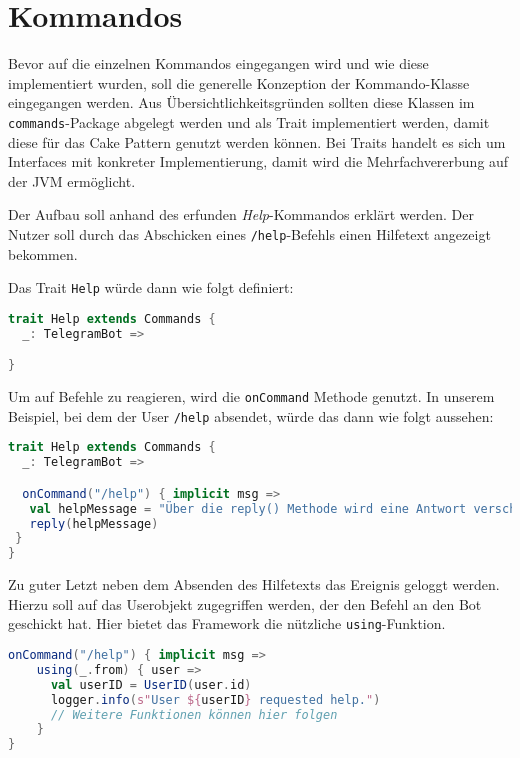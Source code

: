 \section{Kommandos}
Bevor auf die einzelnen Kommandos eingegangen wird und wie diese implementiert wurden, soll die generelle Konzeption der Kommando-Klasse eingegangen werden. Aus Übersichtlichkeitsgründen sollten diese Klassen im \texttt{commands}-Package abgelegt werden und als Trait implementiert werden, damit diese für das Cake Pattern genutzt werden können. Bei Traits handelt es sich um Interfaces mit konkreter Implementierung, damit wird die Mehrfachvererbung auf der JVM ermöglicht.

Der Aufbau soll anhand des erfunden \emph{Help}-Kommandos erklärt werden. Der Nutzer soll durch das Abschicken eines \texttt{/help}-Befehls einen Hilfetext angezeigt bekommen.

Das Trait \texttt{Help} würde dann wie folgt definiert:

\begin{lstlisting}[language=scala,style=scala,caption=Grundstruktur eines eigenen Kommandos]
trait Help extends Commands {
  _: TelegramBot =>

}
\end{lstlisting}

Um auf Befehle zu reagieren, wird die \texttt{onCommand} Methode genutzt. In unserem Beispiel, bei dem der User \texttt{/help} absendet, würde das dann wie folgt aussehen:

\begin{lstlisting}[language=scala, style=scala, caption=Reaktion auf den help-Befehl]
trait Help extends Commands {
  _: TelegramBot =>

  onCommand("/help") { implicit msg =>
   val helpMessage = "Über die reply() Methode wird eine Antwort verschickt."
   reply(helpMessage)
 }
}
\end{lstlisting}

Zu guter Letzt neben dem Absenden des Hilfetexts das Ereignis geloggt werden. Hierzu soll auf das Userobjekt zugegriffen werden, der den Befehl an den Bot geschickt hat. Hier bietet das Framework die nützliche \texttt{using}-Funktion.

\begin{lstlisting}[language=scala, style=scala, caption=Zugriff auf das User Objekt]
onCommand("/help") { implicit msg =>
    using(_.from) { user =>
      val userID = UserID(user.id)
      logger.info(s"User ${userID} requested help.")
      // Weitere Funktionen können hier folgen
    }
}
\end{lstlisting}

